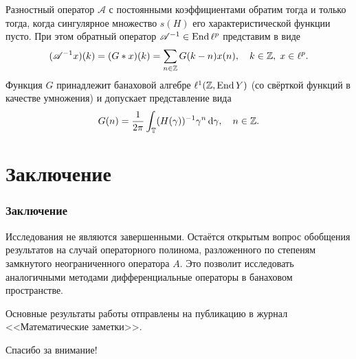 \documentclass{beamer}
\begin{document}
\begin{frame}
\begin{theorem}
    Разностный оператор $\mathcal A$ с постоянными коэффициентами обратим тогда и только тогда, когда сингулярное множество $s(H)$ его характеристической функции пусто. При этом обратный оператор $\mathcal A^{-1} \in \operatorname{End} \ell^p$ представим в виде
    \begin{equation*}
     (\mathcal A^{-1} x)(k) = (G * x)(k)= \sum_{n \in \mathbb{Z}} G(k - n) x(n), \quad k \in \mathbb{Z}, \; x \in \ell^p.
    \end{equation*}
    Функция $G$ принадлежит банаховой алгебре $\ell^1(\mathbb{Z}, \operatorname{End} Y)$ (со свёрткой функций в качестве умножения) и допускает представление вида
    \[ G(n) = \frac{1}{2 \pi} \int_{\mathbb{T}} (H(\gamma))^{-1} \gamma^n \,\mathrm{d} \gamma, \quad n \in \mathbb{Z}. \]
\end{theorem}
\end{frame}

\section{Заключение}
\begin{frame}
\frametitle{Заключение}
Исследования не являются завершенными. Остаётся открытым вопрос обобщения результатов на случай операторного полинома, разложенного по степеням замкнутого неограниченного оператора $A$. Это позволит исследовать аналогичными методами дифференциальные операторы в банаховом пространстве.

Основные результаты работы отправлены на публикацию в журнал <<Математические заметки>>.
\end{frame}

\begin{frame}
\begin{center}
Спасибо за внимание!
\end{center}
\end{frame}
\end{document}

